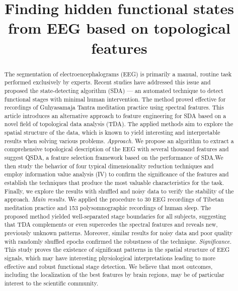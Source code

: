 \documentclass[10pt]{iopart}
\begin{document}
\title[Finding hidden functional states from EEG based on topological features]
        {Finding hidden functional states from EEG based on topological features}

\begin{abstract}

The segmentation of electroencephalograms (EEG) is primarily a manual, routine task performed exclusively by experts. Recent studies have addressed this issue and proposed the state-detecting algorithm (SDA) --- an automated technique to detect functional stages with minimal human intervention. The method proved effective for recordings of Guhyasamaja Tantra meditation practice using spectral features. This article introduces an alternative approach to feature engineering for SDA based on a novel field of topological data analysis (TDA). The applied methods aim to explore the spatial structure of the data, which is known to yield interesting and interpretable results when solving various problems.
\textit{Approach.}
We propose an algorithm to extract a comprehensive topological description of the EEG with several thousand features and suggest QSDA, a feature selection framework based on the performance of SDA.\@ We then study the behavior of four typical dimensionality reduction techniques and employ information value analysis (IV) to confirm the significance of the features and establish the techniques that produce the most valuable characteristics for the task. Finally, we explore the results with shuffled and noisy data to verify the stability of the approach.
\textit{Main results.}
We applied the procedure to 30 EEG recordings of Tibetan meditation practice and 153 polysomnographic recordings of human sleep. The proposed method yielded well-separated stage boundaries for all subjects, suggesting that TDA complements or even supercedes the spectral features and reveals new, previously unknown patterns. Moreover, similar results for noisy data and poor quality with randomly shuffled epochs confirmed the robustness of the technique.
\textit{Significance.}
This study proves the existence of significant patterns in the spatial structure of EEG signals, which may have interesting physiological interpretations leading to more effective and robust functional stage detection. We believe that most outcomes, including the localization of the best features by brain regions, may be of particular interest to the scientific community.

\end{abstract}
\end{document}
